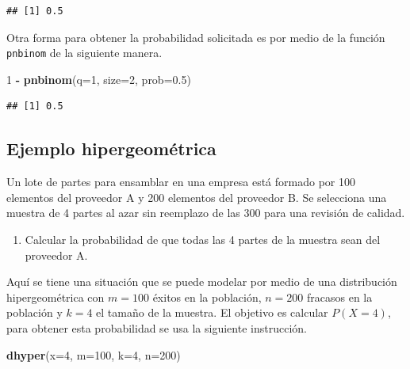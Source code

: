 \documentclass[10pt,]{krantz}
\makeatletter
\newenvironment{Shaded}{\begin{snugshade}}{\end{snugshade}}
\newcommand{\KeywordTok}[1]{\textcolor[rgb]{0.13,0.29,0.53}{\textbf{#1}}}
\newcommand{\DataTypeTok}[1]{\textcolor[rgb]{0.13,0.29,0.53}{#1}}
\newcommand{\DecValTok}[1]{\textcolor[rgb]{0.00,0.00,0.81}{#1}}
\newcommand{\FloatTok}[1]{\textcolor[rgb]{0.00,0.00,0.81}{#1}}
\newcommand{\StringTok}[1]{\textcolor[rgb]{0.31,0.60,0.02}{#1}}
\newcommand{\OperatorTok}[1]{\textcolor[rgb]{0.81,0.36,0.00}{\textbf{#1}}}
\newcommand{\NormalTok}[1]{#1}
\providecommand{\tightlist}{%
  \setlength{\itemsep}{0pt}\setlength{\parskip}{0pt}}
\newenvironment{kframe}{%
\medskip{}
\setlength{\fboxsep}{.8em}
 \def\at@end@of@kframe{}%
 \ifinner\ifhmode%
  \def\at@end@of@kframe{\end{minipage}}%
  \begin{minipage}{\columnwidth}%
 \fi\fi%
 \def\FrameCommand##1{\hskip\@totalleftmargin \hskip-\fboxsep
 \colorbox{shadecolor}{##1}\hskip-\fboxsep
     \hskip-\linewidth \hskip-\@totalleftmargin \hskip\columnwidth}%
 \MakeFramed {\advance\hsize-\width
   \@totalleftmargin\z@ \linewidth\hsize
   \@setminipage}}%
 {\par\unskip\endMakeFramed%
 \at@end@of@kframe}
\renewenvironment{Shaded}{\begin{kframe}}{\end{kframe}}
\makeatother
\begin{document}
\begin{verbatim}
## [1] 0.5
\end{verbatim}

Otra forma para obtener la probabilidad solicitada es por medio de la
función \texttt{pnbinom} de la siguiente manera.

\begin{Shaded}
\begin{Highlighting}[]
\DecValTok{1} \OperatorTok{-}\StringTok{ }\KeywordTok{pnbinom}\NormalTok{(}\DataTypeTok{q=}\DecValTok{1}\NormalTok{, }\DataTypeTok{size=}\DecValTok{2}\NormalTok{, }\DataTypeTok{prob=}\FloatTok{0.5}\NormalTok{)}
\end{Highlighting}
\end{Shaded}

\begin{verbatim}
## [1] 0.5
\end{verbatim}

\subsection*{Ejemplo hipergeométrica}\label{ejemplo-hipergeometrica}


Un lote de partes para ensamblar en una empresa está formado por 100
elementos del proveedor A y 200 elementos del proveedor B. Se selecciona
una muestra de 4 partes al azar sin reemplazo de las 300 para una
revisión de calidad.

\begin{enumerate}
\def\labelenumi{\arabic{enumi})}
\tightlist
\item
  Calcular la probabilidad de que todas las 4 partes de la muestra sean
  del proveedor A.
\end{enumerate}

Aquí se tiene una situación que se puede modelar por medio de una
distribución hipergeométrica con \(m=100\) éxitos en la población,
\(n=200\) fracasos en la población y \(k=4\) el tamaño de la muestra. El
objetivo es calcular \(P(X=4)\), para obtener esta probabilidad se usa
la siguiente instrucción.

\begin{Shaded}
\begin{Highlighting}[]
\KeywordTok{dhyper}\NormalTok{(}\DataTypeTok{x=}\DecValTok{4}\NormalTok{, }\DataTypeTok{m=}\DecValTok{100}\NormalTok{, }\DataTypeTok{k=}\DecValTok{4}\NormalTok{, }\DataTypeTok{n=}\DecValTok{200}\NormalTok{)}
\end{Highlighting}
\end{Shaded}
\end{document}
